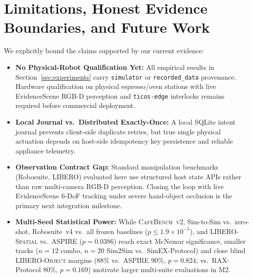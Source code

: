 \documentclass{trax}
\begin{document}
\begin{table}[t]
\centering
\caption{Official \textsc{LIBERO-Spatial} ($10/10$) and pre-registered zero-tuning blind \textsc{LIBERO-Object} ($10/10$, frozen commit \texttt{108648a}, \texttt{evidence\_source=simulator}, \texttt{observation\_contract=host\_state\_api}). $\dagger$ Local matched-contract adaptation (\texttt{protocol\_adapted\_from\_rax\_2610\_22496}), not an official RGB-D reproduction. $\ddagger$ Unmatched literature reference~\cite{huang2026rax}: raw $256{\times}256$ RGB-D + 3 goal images, Claude Opus 5.5, $\le 20$ episodes/task, $n{=}500$/suite.}
\label{tab:libero_m1}
\small
\resizebox{\linewidth}{!}{}
\end{table}

\section{Limitations, Honest Evidence Boundaries, and Future Work}
\label{sec:limitations}

We explicitly bound the claims supported by our current evidence:
\begin{itemize}
    \item \textbf{No Physical-Robot Qualification Yet:} All empirical results in Section~\ref{sec:experiments} carry \texttt{simulator} or \texttt{recorded\_data} provenance. Hardware qualification on physical espresso/oven stations with live EvidenceScene RGB-D perception and \texttt{ticos-edge} interlocks remains required before commercial deployment.
    \item \textbf{Local Journal vs.\ Distributed Exactly-Once:} A local SQLite intent journal prevents client-side duplicate retries, but true single physical actuation depends on host-side idempotency key persistence and reliable appliance telemetry.
    \item \textbf{Observation Contract Gap:} Standard manipulation benchmarks (Robosuite, LIBERO) evaluated here use structured host state APIs rather than raw multi-camera RGB-D perception. Closing the loop with live EvidenceScene 6-DoF tracking under severe hand-object occlusion is the primary next integration milestone.
    \item \textbf{Multi-Seed Statistical Power:} While \textsc{CafeBench~v2}, Sim-to-Sim vs.\ zero-shot, Robosuite~v4 vs.\ all frozen baselines ($p \le 1.9{\times}10^{-5}$), and \textsc{LIBERO-Spatial} vs.\ ASPIRE ($p{=}0.0386$) reach exact McNemar significance, smaller tracks ($n{=}12$ combo, $n{=}20$ Sim2Sim vs.\ SimEX-Protocol) and close blind \textsc{LIBERO-Object} margins ($88\%$ vs.\ ASPIRE $90\%$, $p{=}0.824$; vs.\ RAX-Protocol $80\%$, $p{=}0.169$) motivate larger multi-suite evaluations in M2.
\end{itemize}
\end{document}
